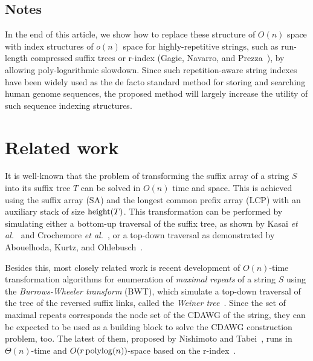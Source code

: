 \documentclass{article}
\begin{document}
\bigskip



\subsection{Notes} In the end of this article, we show how to replace these structure of $O(n)$ space with index structures of $o(n)$ space for highly-repetitive strings, such as run-length compressed suffix trees or r-index (Gagie, Navarro, and Prezza~\cite{gagie:navarro:prezza2020fully}), by allowing poly-logarithmic slowdown. Since such repetition-aware string indexes have been widely used as the de facto standard method for storing and searching human genome sequences, the proposed method will largely increase the utility of such sequence indexing structures.

\section{Related work}
It is well-known that the problem of transforming the suffix array of a string $S$ into its suffix tree $T$ can be solved in $O(n)$ time and space. This is achieved using the suffix array (SA) and the longest common prefix array (LCP)  with an auxiliary stack of size $\mathrm{height}(T)$.
This transformation can be performed by simulating either
a bottom-up traversal of the suffix tree, as shown by Kasai \textit{et al.}~\cite{kasai:lee2001lcp:linear} and Crochemore \textit{et al.}~\cite{crochemore2021book125problems:chap:satostree}, or
a top-down traversal as demonstrated by Abouelhoda, Kurtz, and Ohlebusch~\cite{abouelhoda2004replacing}.

Besides this, most closely related work is recent development of $O(n)$-time transformation algorithms for enumeration of \textit{maximal repeats} of a string $S$ using the \textit{Burrows-Wheeler transform} (BWT), 
which simulate a top-down traversal of the tree of the reversed suffix links, called the \textit{Weiner tree}~\cite{beller:berger2012space:efficient:bbo,nishimoto:cpm2021enum}. 
Since the set of maximal repeats corresponds the node set of the CDAWG of the string, they can be expected to be used as a building block to solve the CDAWG construction problem, too. The latest of them, proposed by Nishimoto and Tabei~\cite{nishimoto:cpm2021enum}, runs in $\Theta(n)$-time and $O(r\,\mathrm{polylog}(n))$-space based on the r-index~\cite{gagie:navarro:prezza2020fully}.  
\end{document}
